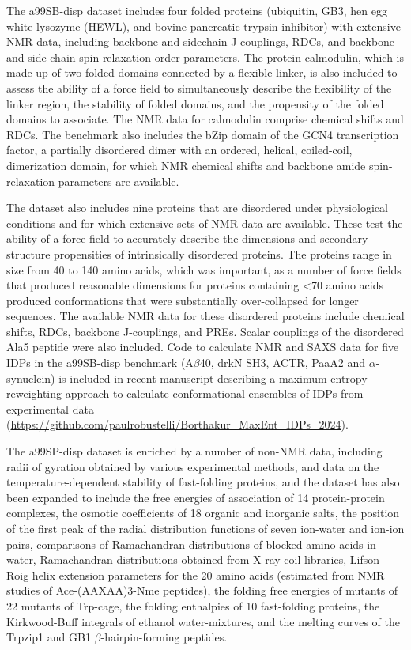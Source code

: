 \documentclass[9pt,review]{livecoms}
\begin{document}
The a99SB-disp dataset includes four folded proteins (ubiquitin, GB3, hen egg white lysozyme (HEWL), and bovine pancreatic trypsin inhibitor) with extensive NMR data, including backbone and sidechain J-couplings, RDCs, and backbone and side chain spin relaxation order parameters.
The protein calmodulin, which is made up of two folded domains connected by a flexible linker, is also included to assess the ability of a force field to simultaneously describe the flexibility of the linker region, the stability of folded domains, and the propensity of the folded domains to associate.
The NMR data for calmodulin comprise chemical shifts and RDCs.
The benchmark also includes the bZip domain of the GCN4 transcription factor, a partially disordered dimer with an ordered, helical, coiled-coil, dimerization domain, for which NMR chemical shifts and backbone amide spin-relaxation parameters are available. 

The dataset also includes nine proteins that are disordered under physiological conditions and for which extensive sets of NMR data are available.
These test the ability of a force field to accurately describe the dimensions and secondary structure propensities of intrinsically disordered proteins.
The proteins range in size from 40 to 140 amino acids, which was important, as a number of force fields that produced reasonable dimensions for proteins containing <70 amino acids produced conformations that were substantially over-collapsed for longer sequences.
The available NMR data for these disordered proteins include chemical shifts, RDCs, backbone J-couplings, and PREs.
Scalar couplings of the disordered Ala5 peptide were also included.  Code to calculate NMR and SAXS data for five IDPs in the a99SB-disp benchmark (A$\beta$40, drkN SH3, ACTR, PaaA2 and $\alpha$-synuclein) is included in recent manuscript describing a maximum entropy reweighting approach to calculate conformational ensembles of IDPs from experimental data\cite{borthakur2024determining} (\url{https://github.com/paulrobustelli/Borthakur_MaxEnt_IDPs_2024}).  

The a99SP-disp dataset is enriched by a number of non-NMR data, including radii of gyration obtained by various experimental methods, and data on the temperature-dependent stability of fast-folding proteins, and the dataset has also been expanded \cite{piana_development_2020} to include the free energies of association of 14 protein-protein complexes, the osmotic coefficients of 18 organic and inorganic salts, the position of the first peak of the radial distribution functions of seven ion-water and ion-ion pairs, comparisons of Ramachandran distributions of blocked amino-acids in water, Ramachandran distributions obtained from X-ray coil libraries, Lifson-Roig helix extension parameters for the 20 amino acids (estimated from NMR studies of Ace-(AAXAA)3-Nme peptides), the folding free energies of mutants of 22 mutants of Trp-cage, the folding enthalpies of 10 fast-folding proteins, the Kirkwood-Buff integrals of ethanol water-mixtures, and the melting curves of the Trpzip1 and GB1 $\beta$-hairpin-forming peptides.
\end{document}
